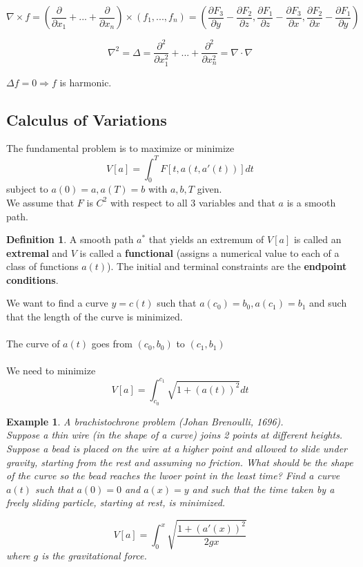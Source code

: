 \documentclass[12pt]{article}
\theoremstyle{plain}
\newtheorem{example}[theorem]{Example}
\theoremstyle{definition}
\newtheorem{definition}[theorem]{Definition}
\begin{document}
$$\nabla \times f = (\frac{\partial}{\partial x_1} + ... + \frac{\partial}{\partial x_n}) \times (f_1,...,f_n) = (\frac{\partial F_3}{\partial y} - \frac{\partial F_2}{\partial z}, \frac{\partial F_1}{\partial z} - \frac{\partial F_3}{\partial x}, \frac{\partial F_2}{\partial x} - \frac{\partial F_1}{\partial y})$$

$$\nabla^2 = \Delta = \frac{\partial^2}{\partial x_1^2} + ... + \frac{\partial^2}{\partial x_n^2} = \nabla \cdot \nabla$$

$\Delta f = 0 \Longrightarrow f$ is harmonic.

\subsection{Calculus of Variations}

The fundamental problem is to maximize or minimize
$$V[a]=\int^T_0 F[t, a(t, a'(t))]dt$$
subject to $a(0) = a, a(T)=b$ with $a,b,T$ given.\\
We assume that $F$ is $C^2$ with respect to all 3 variables and that $a$ is a smooth path.

\begin{definition}
	A smooth path $a^*$ that yields an extremum of $V[a]$ is called an \textbf{extremal} and $V$ is called a \textbf{functional} (assigns a numerical value to each of a class of functions $a(t)$). The initial and terminal constraints are the \textbf{endpoint conditions}.
\end{definition}

We want to find a curve $y=c(t)$ such that $a(c_0) = b_0, a(c_1) = b_1$ and such that the length of the curve is minimized.\\
\\
The curve of $a(t)$ goes from $(c_0, b_0)$ to $(c_1, b_1)$\\
\\
We need to minimize
$$V[a] = \int^{c_1}_{c_0} \sqrt{1 + (a (t))^2} dt$$

\begin{example}
	A brachistochrone problem (Johan Brenoulli, 1696).\\
	Suppose a thin wire (in the shape of a curve) joins 2 points at different heights. Suppose a bead is placed on the wire at a higher point and allowed to slide under gravity, starting from the rest and assuming no friction. What should be the shape of the curve so the bead reaches the lwoer point in the least time? Find a curve $a(t)$ such that $a(0)=0$ and $a(x)=y$ and such that the time taken by a freely sliding particle, starting at rest, is minimized.

	$$V[a] = \int^x_0 \sqrt{\frac{1+(a'(x))^2}{2 g x}}$$
	where $g$ is the gravitational force.
\end{example}
\end{document}

